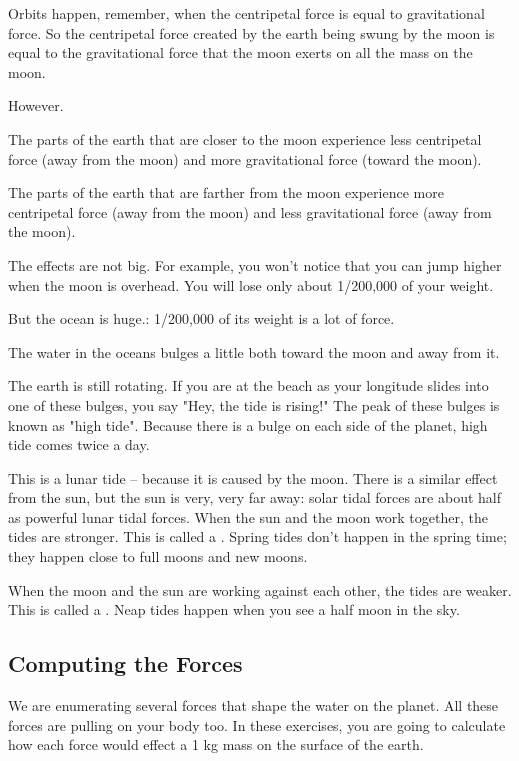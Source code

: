Orbits happen, remember, when the centripetal force is equal to gravitational force.  So the centripetal force created by the earth being swung by the moon is equal to the gravitational force that the moon exerts on all the mass on the moon.

However.  

The parts of the earth that are closer to the moon experience less centripetal force (away from the moon) and more gravitational force (toward the moon).

The parts of the earth that are farther from the moon experience more centripetal force (away from the moon) and less gravitational force (away from the moon).   

The effects are not big.  For example,  you won't notice that you can jump higher when the moon is 
overhead.  You will lose only about 1/200,000 of your weight.

But the ocean is huge.: 1/200,000 of its weight is a lot of force.

The water in the oceans bulges a little both toward the moon and away from it.

The earth is still rotating.  If you are at the beach as your longitude slides into one of these bulges,   you say "Hey, the tide is rising!"  The peak of these bulges is known as "high tide".  Because there is a bulge on each 
side of the planet,  high tide comes twice a day.

This is a lunar tide -- because it is caused by the moon.  There is a similar effect from the sun,  but the sun is very, very far away: solar tidal forces are about half as powerful lunar tidal forces.  When the sun and the moon work together,   the tides are stronger.  This is called a .   Spring tides don't happen in the spring time;  they happen close to full moons and new moons.

When the moon and the sun are working against each other,  the tides are weaker.  This is called a .  Neap tides happen when you see a half moon in the sky.

\subsection{Computing the Forces}

We are enumerating several forces that shape the water on the planet.  All these forces are pulling on your
body too.  In these exercises, you are going to calculate how each force would effect a 1 kg mass on the surface of the earth.

